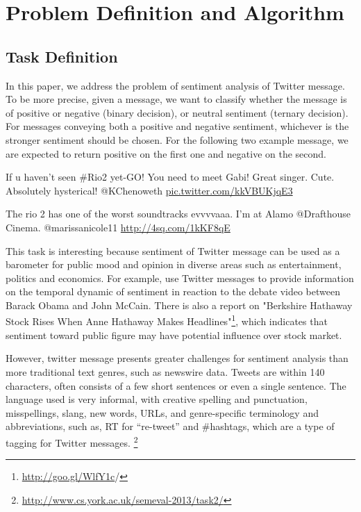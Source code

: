 \section{Problem Definition and Algorithm}
\subsection{Task Definition}
In this paper, we address the problem of sentiment analysis of Twitter message. To be more precise, 
given a message, we want to classify whether the message is of positive or negative (binary decision), or neutral sentiment (ternary decision). For messages conveying both a positive and negative sentiment, whichever is the stronger sentiment should be chosen. For the following two example message, we are expected to return positive on the first one and negative on the second. 
\begin{mdframed}[
  leftmargin=\parindent,
  rightmargin=\parindent,
  skipabove=\topsep,
  skipbelow=\topsep
  ]
  If u haven't seen \#Rio2 yet-GO! You need to meet Gabi! Great singer. Cute. Absolutely hysterical! @KChenoweth \url{pic.twitter.com/kkVBUKjqE3}
\end{mdframed}

\begin{mdframed}[
  leftmargin=\parindent,
  rightmargin=\parindent,
  skipabove=\topsep,
  skipbelow=\topsep
  ]
 The rio 2 has one of the worst soundtracks evvvvaaa. I'm at Alamo @Drafthouse Cinema. @marissanicole11 \url{http://4sq.com/1kKF8qE} 
\end{mdframed}

This task is interesting because sentiment of Twitter message can be used as a barometer for public mood and opinion in diverse areas such as entertainment, politics and economics. For example, 
\cite{Diakopoulos:2010} use Twitter messages to provide information on the temporal dynamic of sentiment in reaction to the debate video between Barack Obama and John McCain. There is also a report on "Berkshire Hathaway Stock Rises When Anne Hathaway Makes Headlines"\footnote{\url{http://goo.gl/WlfY1c}/}, which indicates that sentiment toward public figure may have potential influence over stock market. 

However, twitter message presents greater challenges for sentiment analysis than more traditional text genres, such as newswire data.  Tweets are within 140 characters, often consists of a few short sentences or even a single sentence. 
The language used is very informal, with creative spelling and punctuation, misspellings, slang, new words, URLs, and genre-specific terminology and abbreviations, such as, RT for “re-tweet” and \#hashtags, which are a type of tagging for Twitter messages. \footnote{\url{http://www.cs.york.ac.uk/semeval-2013/task2/}}


